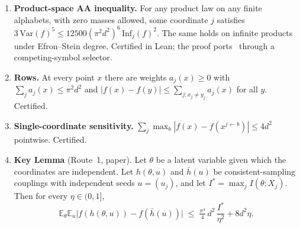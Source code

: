 \documentclass[11pt]{article}
\theoremstyle{definition}\newtheorem{definition}[theorem]{Definition}\newtheorem{problem}{Open Problem}
\theoremstyle{remark}\newtheorem{remark}[theorem]{Remark}
\newcommand{\E}{\mathbb{E}}\newcommand{\poly}{\mathrm{poly}}
\begin{document}
\begin{enumerate}[label=(I\arabic*)]
\item \textbf{Product-space AA inequality.} For any product law on any finite alphabets, with zero masses allowed, some coordinate $j$ satisfies $3\,\mathrm{Var}(f)^5\le 12500(\pi^2d^2)^6\,\mathrm{Inf}_j(f)^2$. The same holds on infinite products under Efron--Stein degree. Certified in Lean; the proof ports~\cite{Tur26} through a competing-symbol selector.
\item \textbf{Rows.} At every point $x$ there are weights $a_j(x)\ge0$ with $\sum_j a_j(x)\le\pi^2d^2$ and $|f(x)-f(y)|\le\sum_{j:x_j\ne y_j}a_j(x)$ for all $y$. Certified.
\item \textbf{Single-coordinate sensitivity.} $\sum_j \max_b |f(x)-f(x^{j\leftarrow b})|\le 4d^2$ pointwise. Certified.
\item \textbf{Key Lemma} (Route~1, paper). Let $\theta$ be a latent variable given which the coordinates are independent. Let $h(\theta,u)$ and $\bar h(u)$ be consistent-sampling couplings with independent seeds $u=(u_j)$, and let $I^*=\max_j I(\theta;X_j)$. Then for every $\eta\in(0,1]$,
\[ \E_\theta\E_u\bigl|f(h(\theta,u))-f(\bar h(u))\bigr|\;\le\;\tfrac{\pi^4}{4}\,d^2\,\frac{I^*}{\eta^2}+8d^2\eta . \]
\end{enumerate}
\end{document}
